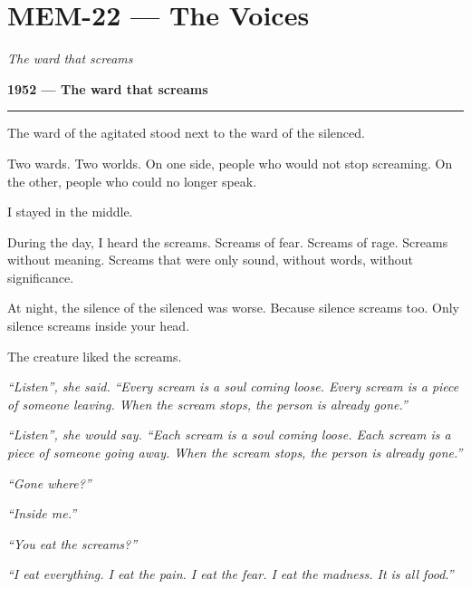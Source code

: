 \section*{\textbf{MEM-22} --- The Voices}

\noindent \textit{The ward that screams}

\noindent \textbf{1952 --- The ward that screams}

\vspace{0.5em}\noindent\rule{\textwidth}{0.5pt}\vspace{0.5em}

\noindent The ward of the agitated stood next to the ward of the silenced.

\noindent Two wards. Two worlds. On one side, people who would not stop screaming. On the other, people who could no longer speak.

\noindent I stayed in the middle.

\noindent During the day, I heard the screams. Screams of fear. Screams of rage. Screams without meaning. Screams that were only sound, without words, without significance.

\noindent At night, the silence of the silenced was worse. Because silence screams too. Only silence screams inside your head.

\noindent The creature liked the screams.

\noindent \textit{\textquotedblleft{}Listen\textquotedblright{}}\textit{, she said. }\textit{\textquotedblleft{}Every scream is a soul coming loose. Every scream is a piece of someone leaving. When the scream stops, the person is already gone.\textquotedblright{}}

\noindent \textit{\textquotedblleft{}Listen\textquotedblright{}\textit{, she would say. }\textquotedblleft{}Each scream is a soul coming loose. Each scream is a piece of someone going away. When the scream stops, the person is already gone.\textquotedblright{}}

\noindent \textit{\textquotedblleft{}Gone where?\textquotedblright{}}

\noindent \textit{\textquotedblleft{}Inside me.\textquotedblright{}}

\noindent \textit{\textquotedblleft{}You eat the screams?\textquotedblright{}}

\noindent \textit{\textquotedblleft{}I eat everything. I eat the pain. I eat the fear. I eat the madness. It is all food.\textquotedblright{}}

